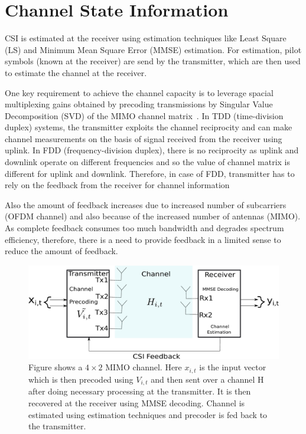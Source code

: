 \documentclass[11pt,a4paper]{report}
\begin{document}
\section{Channel State Information}     
CSI is estimated at the receiver using estimation techniques like Least Square (LS)
and Minimum Mean Square Error (MMSE) estimation. For estimation, pilot symbols
(known at the receiver) are send by the transmitter, which are then used to estimate
the channel at the receiver.

One key requirement to achieve the channel capacity is to leverage spacial multiplexing gains
obtained by precoding transmissions by Singular Value Decomposition (SVD) of the MIMO
channel matrix~\cite{love2008overview}. 
In TDD (time-division duplex) systems, the transmitter exploits the channel reciprocity
and can make channel measurements on the basis of signal received from the receiver using 
uplink. In FDD (frequency-division duplex), there is no reciprocity as uplink and 
downlink operate on different frequencies and so the value of channel matrix
is different for uplink and downlink. Therefore, in case of FDD, transmitter has
to rely on the feedback from the receiver for channel information


Also the amount of feedback increases due to increased number of subcarriers (OFDM channel) 
and also because of the increased number of antennas (MIMO). As complete
feedback consumes too much bandwidth and degrades spectrum efficiency, therefore, 
there is a need to provide feedback in a limited sense to reduce the amount of 
feedback. 


\begin{figure}
\begin{center}
\includegraphics[width=0.9\columnwidth]{images/drawing.pdf}
\caption{Figure shows a $4\times2$ MIMO channel. Here $x_{i,t}$ is the input vector
which is then precoded using $V_{i,t}$ and then sent over a channel H after
doing necessary processing at the transmitter. It is then recovered at the receiver using
MMSE decoding. Channel is estimated using estimation techniques and precoder is fed back to the
transmitter. }
\label{fig:mimo}
\end{center}
\end{figure}
\end{document}
